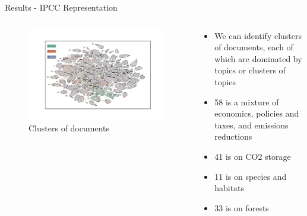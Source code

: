 \documentclass[9pt]{beamer}
\begin{document}
\begin{frame}{Results - IPCC Representation}

\begin{columns}
	\begin{column}{0.65\linewidth}
		\begin{figure}	
			\includegraphics[width=\linewidth]{../tsne_results/plots/run_662_s_100000_p30_clusters_wgs.png}
			\caption{Clusters of documents}
		\end{figure}
	\end{column}
	\begin{column}{0.35\linewidth}	
		\begin{center}
			\begin{itemize}
				\item<1-> We can identify clusters of documents, each of which are dominated by topics or clusters of topics
				\item<2-> 58 is a mixture of economics, policies and taxes, and emissions reductions
				\item<3-> 41 is on CO2 storage
				\item<4-> 11 is on species and habitats
				\item<5-> 33 is on forests
			\end{itemize}
		\end{center}
	\end{column}
\end{columns}

\end{frame}
\end{document}
